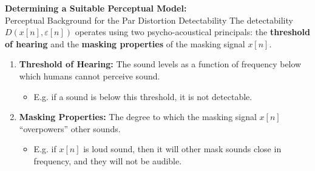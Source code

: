 \documentclass[aspectratio=169]{beamer}
\begin{document}
\begin{frame}{\textbf{Determining a Suitable Perceptual Model:}\\ Perceptual Background for the Par Distortion Detectability}
    The detectability $D(x[n], \varepsilon[n])$ operates using two psycho-acoustical principals: the \textbf{threshold of hearing} 
    and the \textbf{masking properties} of the masking signal $x[n]$.
    \vspace{10pt}
    \begin{enumerate}
        \item \textbf{Threshold of Hearing:} The sound levels as a function of frequency below which humans cannot perceive sound.
            \begin{itemize}
                \item E.g. if a sound is below this threshold, it is not detectable.
            \end{itemize}
        \vspace{10pt}
        \item \textbf{Masking Properties:} The degree to which the masking signal $x[n]$ ``overpowers'' other sounds.
            \begin{itemize}
                \item E.g. if $x[n]$ is loud sound, then it will other mask sounds close in frequency, and they will not be audible.
            \end{itemize}
    \end{enumerate}
\end{frame}

\end{document}
